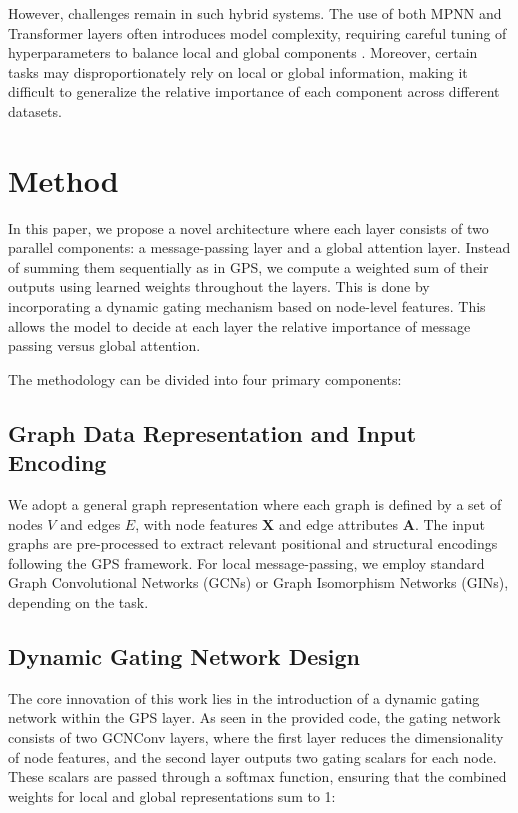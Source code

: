 \documentclass{acmart}
\begin{document}
However, challenges remain in such hybrid systems. The use of both MPNN and Transformer layers often introduces model complexity, requiring careful tuning of hyperparameters to balance local and global components \cite{Rampasek2022}. Moreover, certain tasks may disproportionately rely on local or global information, making it difficult to generalize the relative importance of each component across different datasets.

\section{Method}

In this paper, we propose a novel architecture where each layer consists of two parallel components: a message-passing layer and a global attention layer. Instead of summing them sequentially as in GPS, we compute a weighted sum of their outputs using learned weights throughout the layers. This is done by incorporating a dynamic gating mechanism based on node-level features. This allows the model to decide at each layer the relative importance of message passing versus global attention.

The methodology can be divided into four primary components:

\subsection{Graph Data Representation and Input Encoding}

We adopt a general graph representation where each graph is defined by a set of nodes $V$ and edges $E$, with node features $\mathbf{X}$ and edge attributes $\mathbf{A}$. The input graphs are pre-processed to extract relevant positional and structural encodings following the GPS framework. For local message-passing, we employ standard Graph Convolutional Networks (GCNs) or Graph Isomorphism Networks (GINs), depending on the task.

\subsection{Dynamic Gating Network Design}

The core innovation of this work lies in the introduction of a dynamic gating network within the GPS layer. As seen in the provided code, the gating network consists of two GCNConv layers, where the first layer reduces the dimensionality of node features, and the second layer outputs two gating scalars for each node. These scalars are passed through a softmax function, ensuring that the combined weights for local and global representations sum to 1:
\end{document}
